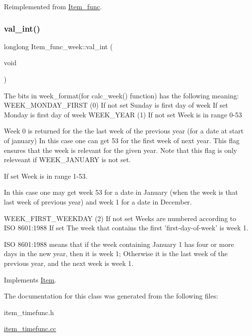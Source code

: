 Reimplemented from \mbox{\hyperlink{classItem__func_a6413cdbe7b14be77cc47462c9fc87ddb}{Item\+\_\+func}}.

\mbox{\label{classItem__func__week_a3595e7912d6f7e80ab35b89c7345ed5b}} 
\subsubsection{\texorpdfstring{val\+\_\+int()}{val\_int()}}
{\footnotesize\ttfamily longlong Item\+\_\+func\+\_\+week\+::val\+\_\+int (\begin{DoxyParamCaption}\item[{void}]{ }\end{DoxyParamCaption})\hspace{0.3cm}{\ttfamily [virtual]}}

\begin{DoxyVerb} The bits in week_format(for calc_week() function) has the following meaning:
  WEEK_MONDAY_FIRST (0)  If not set Sunday is first day of week
                  If set    Monday is first day of week
  WEEK_YEAR (1)   If not set    Week is in range 0-53

    Week 0 is returned for the the last week of the previous year (for
   a date at start of january) In this case one can get 53 for the
   first week of next year.  This flag ensures that the week is
   relevant for the given year. Note that this flag is only
   releveant if WEEK_JANUARY is not set.

          If set     Week is in range 1-53.

   In this case one may get week 53 for a date in January (when
   the week is that last week of previous year) and week 1 for a
   date in December.

 WEEK_FIRST_WEEKDAY (2)  If not set Weeks are numbered according
                to ISO 8601:1988
          If set    The week that contains the first
                'first-day-of-week' is week 1.
   
   ISO 8601:1988 means that if the week containing January 1 has
   four or more days in the new year, then it is week 1;
   Otherwise it is the last week of the previous year, and the
   next week is week 1.
\end{DoxyVerb}
 

Implements \mbox{\hyperlink{classItem}{Item}}.



The documentation for this class was generated from the following files\+:\begin{DoxyCompactItemize}
\item 
item\+\_\+timefunc.\+h\item 
\mbox{\hyperlink{item__timefunc_8cc}{item\+\_\+timefunc.\+cc}}\end{DoxyCompactItemize}
